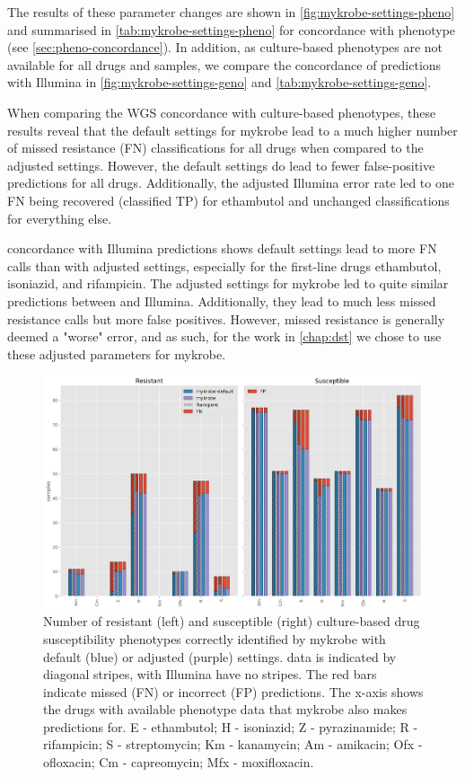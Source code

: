 The results of these parameter changes are shown in \autoref{fig:mykrobe-settings-pheno} and summarised in \autoref{tab:mykrobe-settings-pheno} for concordance with phenotype (see \autoref{sec:pheno-concordance}). In addition, as culture-based phenotypes are not available for all drugs and samples, we compare the concordance of \ont{} predictions with Illumina in \autoref{fig:mykrobe-settings-geno} and \autoref{tab:mykrobe-settings-geno}.

When comparing the WGS concordance with culture-based phenotypes, these results reveal that the default \ont{} settings for mykrobe lead to a much higher number of missed resistance (FN) classifications for all drugs when compared to the adjusted settings. However, the default settings do lead to fewer false-positive predictions for all drugs. Additionally, the adjusted Illumina error rate led to one FN being recovered (classified TP) for ethambutol and unchanged classifications for everything else.

\ont{} concordance with Illumina predictions shows default settings lead to more FN calls than with adjusted settings, especially for the first-line drugs ethambutol, isoniazid, and rifampicin. The adjusted settings for mykrobe led to quite similar predictions between \ont{} and Illumina. Additionally, they lead to much less \ont{} missed resistance calls but more false positives. However, missed resistance is generally deemed a "worse" error, and as such, for the work in \autoref{chap:dst} we chose to use these adjusted parameters for mykrobe.

\begin{figure}
\begin{center}
\includegraphics[width=0.90\columnwidth]{Appendix2/Figs/mykrobe_settings_pheno.png}
\caption{{Number of resistant (left) and susceptible (right) culture-based drug susceptibility phenotypes correctly identified by mykrobe with default (blue) or adjusted (purple) settings. \ont{} data is indicated by diagonal stripes, with Illumina have no stripes. The red bars indicate missed (FN) or incorrect (FP) predictions. The x-axis shows the drugs with available phenotype data that mykrobe also makes predictions for. E - ethambutol; H - isoniazid; Z - pyrazinamide; R - rifampicin; S - streptomycin; Km - kanamycin; Am - amikacin; Ofx - ofloxacin; Cm - capreomycin; Mfx - moxifloxacin.
{\label{fig:mykrobe-settings-pheno}}
}}
\end{center}
\end{figure}

